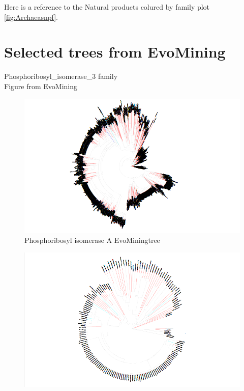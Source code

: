 \documentclass[12pt,twoside]{reedthesis}
\begin{document}
  Here is a reference to the Natural products colured by family plot
  \autoref{fig:Archaeasnpf}. \clearpage 
  
  \section{Selected trees from
  EvoMining}\label{selected-trees-from-evomining}
  
  Phosphoribosyl\_isomerase\_3 family\\
  Figure from EvoMining
  
  \begin{figure}[h!tbp]
  \centering
  \includegraphics[angle = 180,scale = 0.25]{chapter2/Archaeas/tree41.png}
  \caption[Phosphoribosyl isomerase A EvoMiningtree]{\normalsize{Phosphoribosyl isomerase A EvoMiningtree}}
  \label{fig:Phosphoribosyl_isomerase_A_evo_tree}
  \end{figure}\begin{figure}[h!tbp]
  \centering
  \includegraphics[angle = 180,scale = 0.25]{chapter2/Archaeas/tree42.png}

\end{figure}
\end{document}

